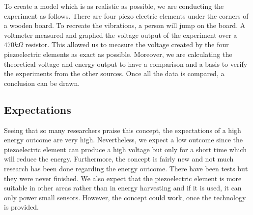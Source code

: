 To create a model which is as realistic as possible, we are conducting the experiment as follows. There are four piezo electric elements under the corners of a wooden board. To recreate the vibrations, a person will jump on the board. A voltmeter measured and graphed the voltage output of the experiment over a $470k\Omega$ resistor. This allowed us to measure the voltage created by the four piezoelectric elements as exact as possible. Moreover, we are calculating the theoretical voltage and energy output to have a comparison and a basis to verify the experiments from the other sources. Once all the data is compared, a conclusion can be drawn.

\subsection{Expectations}

Seeing that so many researchers praise this concept, the expectations of a high energy outcome are very high. Nevertheless, we expect a low outcome since the piezoelectric element can produce a high voltage but only for a short time which will reduce the energy. Furthermore, the concept is fairly new and not much research has been done regarding the energy outcome. There have been tests but they were never finished. We also expect that the piezoelectric element is more suitable in other areas rather than in energy harvesting and if it is used, it can only power small sensors. However, the concept could work, once the technology is provided.